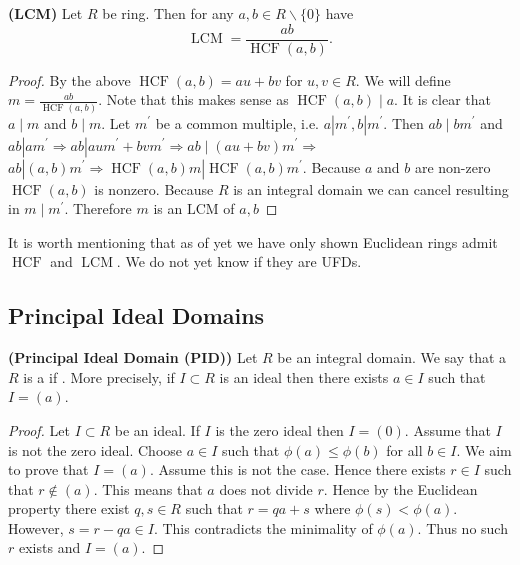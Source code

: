 \documentclass{article}
\newcommand{\bfs}[1]{\textbf{({#1}) }}
\newcommand{\HCF}{\operatorname{HCF}}
\newcommand{\LCM}{\operatorname{LCM}}
\begin{document}
\begin{cora}\bfs{LCM}
Let $R$ be  ring. Then for any $a, b \in R \backslash\{0\}$ have  $$\LCM=\frac{a b}{\HCF(a, b)}.$$
\end{cora}
\begin{proof}
By the above $\HCF(a, b)=a u+b v$ for $u, v \in R$. We will define $m=\frac{a b}{\HCF(a, b)}$. Note that this makes sense as $\HCF(a, b) \mid a$. It is clear that $a \mid m$ and $b \mid m$. Let $m^{\prime}$ be a common multiple, i.e. $a\left|m^{\prime}, b\right| m^{\prime}$. Then $a b \mid b m^{\prime}$ and $a b\left|a m^{\prime} \Rightarrow a b\right| a u m^{\prime}+b v m^{\prime} \Rightarrow a b \mid(a u+b v) m^{\prime} \Rightarrow$ $a b\left|(a, b) m^{\prime} \Rightarrow \HCF(a, b) m\right| \HCF(a, b) m^{\prime}$. Because $a$ and $b$ are non-zero $\HCF(a, b)$ is nonzero. Because $R$ is an integral domain we can cancel resulting in $m \mid m^{\prime}$. Therefore $m$ is an $\mathrm{LCM}$ of $a, b$
\end{proof}

\begin{rema}
 It is worth mentioning that as of yet we have only shown Euclidean rings admit $\HCF$ and $\LCM$. We do not yet know if they are UFDs.
\end{rema}



\subsection{Principal Ideal Domains}
\begin{defa}\bfs{Principal Ideal Domain (PID)}
Let $R$ be an integral domain. We say that a $R$ is a  if . More precisely, if $I \subset R$ is an ideal then there exists $a \in I$ such that $I=(a)$. 
\end{defa}
\begin{thma}
\end{thma}
\begin{proof}
Let $I \subset R$ be an ideal. If $I$ is the zero ideal then $I=(0)$. Assume that $I$ is not the zero ideal. Choose $a \in I$ such that $\phi(a) \leq \phi(b)$ for all $b \in I$. We aim to prove that $I=(a)$. Assume this is not the case. Hence there exists $r \in I$ such that $r \notin(a)$. This means that $a$ does not divide $r$. Hence by the Euclidean property there exist $q, s \in R$ such that $r=q a+s$ where $\phi(s)<\phi(a)$. However, $s=r-q a \in I$. This contradicts the minimality of $\phi(a)$. Thus no such $r$ exists and $I=(a)$.
\end{proof} 
\end{document}
